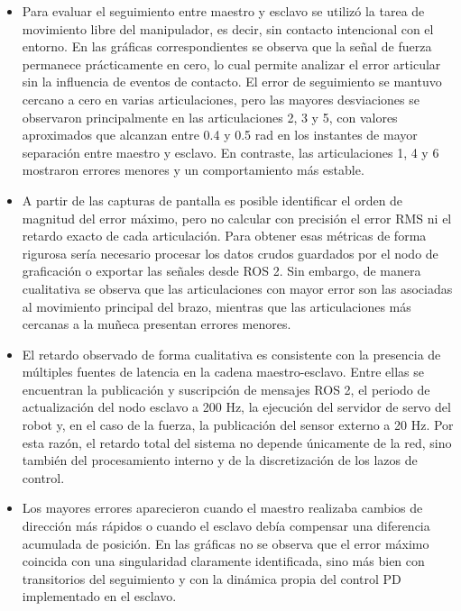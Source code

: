 \documentclass[journal,10pt,twoside]{IEEEtran}
\begin{document}
\begin{itemize}
    \item Para evaluar el seguimiento entre maestro y esclavo se utilizó la tarea de movimiento libre del manipulador, es decir, sin contacto intencional con el entorno. En las gráficas correspondientes se observa que la señal de fuerza permanece prácticamente en cero, lo cual permite analizar el error articular sin la influencia de eventos de contacto. El error de seguimiento se mantuvo cercano a cero en varias articulaciones, pero las mayores desviaciones se observaron principalmente en las articulaciones 2, 3 y 5, con valores aproximados que alcanzan entre 0.4 y 0.5 rad en los instantes de mayor separación entre maestro y esclavo. En contraste, las articulaciones 1, 4 y 6 mostraron errores menores y un comportamiento más estable.
    \\

    \item A partir de las capturas de pantalla es posible identificar el orden de magnitud del error máximo, pero no calcular con precisión el error RMS ni el retardo exacto de cada articulación. Para obtener esas métricas de forma rigurosa sería necesario procesar los datos crudos guardados por el nodo de graficación o exportar las señales desde ROS 2. Sin embargo, de manera cualitativa se observa que las articulaciones con mayor error son las asociadas al movimiento principal del brazo, mientras que las articulaciones más cercanas a la muñeca presentan errores menores.
    \\

    \item El retardo observado de forma cualitativa es consistente con la presencia de múltiples fuentes de latencia en la cadena maestro-esclavo. Entre ellas se encuentran la publicación y suscripción de mensajes ROS 2, el periodo de actualización del nodo esclavo a 200 Hz, la ejecución del servidor de servo del robot y, en el caso de la fuerza, la publicación del sensor externo a 20 Hz. Por esta razón, el retardo total del sistema no depende únicamente de la red, sino también del procesamiento interno y de la discretización de los lazos de control.
    \\

    \item Los mayores errores aparecieron cuando el maestro realizaba cambios de dirección más rápidos o cuando el esclavo debía compensar una diferencia acumulada de posición. En las gráficas no se observa que el error máximo coincida con una singularidad claramente identificada, sino más bien con transitorios del seguimiento y con la dinámica propia del control PD implementado en el esclavo.
\end{itemize}
\end{document}

